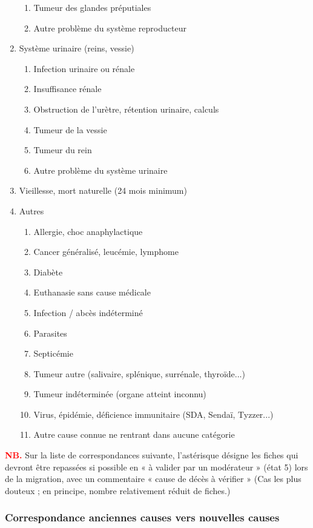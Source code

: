 ﻿\documentclass[a4paper,10pt]{article}
\newcommand\desire[1]{\noindent\textbf{\textcolor{red}{#1}}}
\begin{document}
\begin{enumerate}
\begin{enumerate}
\item Tumeur des glandes préputiales
\item Autre problème du système reproducteur
\end{enumerate}
\item Système urinaire (reins, vessie)
\begin{enumerate}
\item Infection urinaire ou rénale
\item Insuffisance rénale
\item Obstruction de l’urètre, rétention urinaire, calculs
\item Tumeur de la vessie
\item Tumeur du rein
\item Autre problème du système urinaire
\end{enumerate}
\item Vieillesse, mort naturelle (24 mois minimum)
\item Autres
\begin{enumerate}
\item Allergie, choc anaphylactique
\item Cancer généralisé, leucémie, lymphome
\item Diabète
\item Euthanasie sans cause médicale
\item Infection / abcès indéterminé
\item Parasites
\item Septicémie
\item Tumeur autre (salivaire, splénique, surrénale, thyroïde...)
\item Tumeur indéterminée (organe atteint inconnu)
\item Virus, épidémie, déficience immunitaire (SDA, Sendaï, Tyzzer...)
\item Autre cause connue ne rentrant dans aucune catégorie
\end{enumerate}
\end{enumerate}

\desire{NB.} Sur la liste de correspondances suivante, l'astérisque désigne les fiches qui devront être repassées si possible en « à valider par un modérateur » (état 5) lors de la migration, avec un commentaire « cause de décès à vérifier » (Cas les plus douteux ; en principe, nombre relativement réduit de fiches.)  

\subsubsection{Correspondance anciennes causes vers nouvelles causes}
\small
\end{document}
